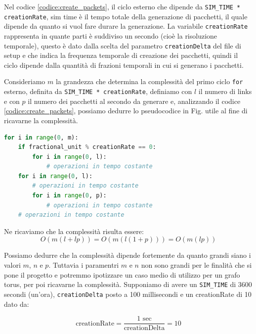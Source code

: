 \documentclass[binding=0.6cm]{sapthesis}
\begin{document}
Nel codice \ref{codice:create_packets}, il ciclo esterno che dipende da \lstinline|SIM_TIME * creationRate|, sim time è il tempo totale della generazione di pacchetti, 
il quale dipende da quanto si vuol fare durare la generazione. La variabile \lstinline|creationRate| rappresenta in quante parti è suddiviso un secondo (cioè la risoluzione temporale), questo è dato
dalla scelta del parametro \texttt{creationDelta} del file di setup e che indica la frequenza temporale di creazione dei pacchetti, quindi il ciclo dipende dalla quantità di frazioni temporali in cui si generano i pacchetti.

Consideriamo \(m\) la grandezza che determina la complessità del primo ciclo \texttt{for} esterno, definita da \lstinline|SIM_TIME * creationRate|, definiamo con \(l\)
il numero di links e con \(p\) il numero dei pacchetti al secondo da generare e, analizzando il codice \ref{codice:create_packets}, possiamo dedurre lo
pseudocodice in Fig. utile al fine di ricavarne la complessità.

{\scriptsize
\begin{lstlisting}[language=Python, basicstyle=\ttfamily, caption={Logica creazione pacchetti, studio della complessità}, label={codice:create_packets_complexity}, breaklines=true]
for i in range(0, m):
    if fractional_unit % creationRate == 0:
        for i in range(0, l): 
            # operazioni in tempo costante
    for i in range(0, l): 
        # operazioni in tempo costante
        for i in range(0, p): 
            # operazioni in tempo costante
    # operazioni in tempo costante
\end{lstlisting}
}

Ne ricaviamo che la complessità risulta essere:
\[
    O(m(l+lp)) = O(m(l(1+p))) = O(m(lp))
\]

Possiamo dedurre che la complessità dipende fortemente da quanto grandi siano i valori \(m\), \(n\) e \(p\).
Tuttavia i paramentri \(m\) e \(n\) non sono grandi per le finalità che si pone il progetto e 
potremmo ipotizzare un caso medio di utilizzo per un grafo torus, per poi ricavarne la complessità. Supponiamo di avere un \texttt{SIM\_TIME} di 3600 secondi (un'ora), \texttt{creationDelta} posto a 100 millisecondi e un creationRate di 10 dato da: 

\begin{equation}
    \text{creationRate} = \frac{1 \text{ sec}}{\text{creationDelta}} = 10 
    \label{eq:creation_rate_example}
\end{equation}
\end{document}

